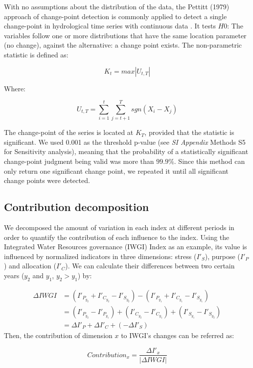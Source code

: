 \documentclass[9pt, twocolumn, twoside, lineno]{pnas-new}
\begin{document}
{		With no assumptions about the distribution of the data, the Pettitt (1979) approach of change-point detection is commonly applied to detect a single change-point in hydrological time series with continuous data \cite{pettittNonParametricApproachChangePoint1979}. 
		It tests $H0$: The variables follow one or more distributions that have the same location parameter (no change), against the alternative: a change point exists. The non-parametric statistic is defined as:
	
		$$ K_t = max|U_{t, T}|$$

		Where:

		$$ U_{t, T} = \sum_{i=1}^t\sum_{j=t+1}^T sgn(X_i - X_j) $$
	
		The change-point of the series is located at $K_T$, provided that the statistic is significant. We used 0.001 as the threshold p-value (see \textit{SI Appendix} Methods S5 for Sensitivity analysis), meaning that the probability of a statistically significant change-point judgment being valid was more than $99.9\%$.
		Since this method can only return one significant change point, we repeated it until all significant change points were detected.
	
	\subsection*{Contribution decomposition}
		We decomposed the amount of variation in each index at different periods in order to quantify the contribution of each influence to the index. Using the Integrated Water Resources governance (IWGI) Index as an example, its value is influenced by normalized indicators in three dimensions: stress ($I'_S$), purpose ($I'_P$) and allocation ($I'_C$). We can calculate their differences between two certain years ($y_2$ and $y_1$, $y_2 > y_1$) by:

		\begin{align*}
			\Delta IWGI &= (I'_{P_{y_2}} + I'_{C_{y_2}} - I'_{S_{y_2}}) - (I'_{P_{y_1}} + I'_{C_{y_1}} - I'_{S_{y_1}}) \\
			&= (I'_{P_{y_2}} - I'_{P_{y_1}}) + (I'_{C_{y_2}} - I'_{C_{y_1}}) + (I'_{S_{y_1}} - I'_{S_{y_2}}) \\
			&= \Delta I'_P + \Delta I'_C + (-\Delta I'_S)
		\end{align*}
		Then, the contribution of dimension $x$ to IWGI's changes can be referred as:

		$$ Contribution_x = \frac{\Delta I'_x}{|\Delta IWGI|} $$

}
\end{document}

